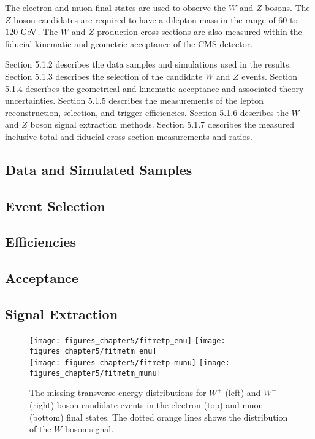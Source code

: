 The electron and muon final states are used to observe the $W$ and $Z$ bosons. The $Z$ boson candidates are required to have a dilepton mass in the range of $60$ to $120~\mathrm{Ge\kern -0.1em V}$. The $W$ and $Z$ production cross sections are also measured within the fiducial kinematic and geometric acceptance of the CMS detector.   

Section 5.1.2 describes the data samples and simulations used in the results. Section 5.1.3 describes the selection of the candidate $W$ and $Z$ events. Section 5.1.4 describes the geometrical and kinematic acceptance and associated theory uncertainties. Section 5.1.5 describes the measurements of the lepton reconstruction, selection, and trigger efficiencies. Section 5.1.6 describes the $W$ and $Z$ boson signal extraction methods. Section 5.1.7 describes the measured inclusive total and fiducial cross section measurements and ratios.  

\subsection{Data and Simulated Samples}



\subsection{Event Selection}

\subsection{Efficiencies}

\subsection{Acceptance}

\subsection{Signal Extraction}

\begin{figure}[h]
\centering
        \texttt{[image: figures\_chapter5/fitmetp\_enu]}
        \texttt{[image: figures\_chapter5/fitmetm\_enu]}\\
        \texttt{[image: figures\_chapter5/fitmetp\_munu]}
        \texttt{[image: figures\_chapter5/fitmetm\_munu]}
       \caption{The missing transverse energy distributions for
         $W^+$  (left) and $W^-$  (right) boson candidate events in the electron (top)
       and muon (bottom) final states. The dotted orange lines shows
       the distribution of the $W$ boson signal. 
       \label{fig:W}}
\end{figure}

